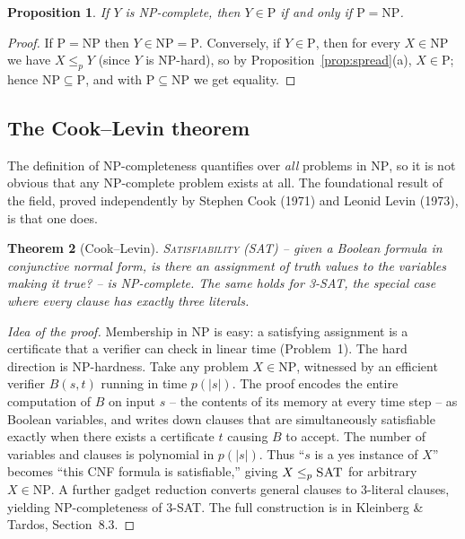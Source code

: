 \documentclass[11pt]{article}
\newtheorem{theorem}{Theorem}[section]
\newtheorem{proposition}[theorem]{Proposition}
\begin{document}
\begin{proposition}
\label{prop:np-collapse}
If $Y$ is NP-complete, then $Y \in \mathrm{P}$ if and only if $\mathrm{P} = \mathrm{NP}$.
\end{proposition}

\begin{proof}
If $\mathrm{P} = \mathrm{NP}$ then $Y \in \mathrm{NP} = \mathrm{P}$. Conversely, if $Y \in
\mathrm{P}$, then for every $X \in \mathrm{NP}$ we have $X \le_p Y$ (since $Y$ is NP-hard),
so by Proposition~\ref{prop:spread}(a), $X \in \mathrm{P}$; hence $\mathrm{NP} \subseteq
\mathrm{P}$, and with $\mathrm{P} \subseteq \mathrm{NP}$ we get equality.
\end{proof}

\subsection{The Cook--Levin theorem}

The definition of NP-completeness quantifies over \emph{all} problems in $\mathrm{NP}$, so
it is not obvious that any NP-complete problem exists at all. The foundational result of the
field, proved independently by Stephen Cook (1971) and Leonid Levin (1973), is that one
does.

\begin{theorem}[Cook--Levin]
\label{thm:cook-levin}
\textsc{Satisfiability} (\textsc{SAT}) -- given a Boolean formula in conjunctive normal
form, is there an assignment of truth values to the variables making it true? -- is
NP-complete. The same holds for \textsc{3-SAT}, the special case where every clause has
exactly three literals.
\end{theorem}

\begin{proof}[Idea of the proof]
Membership in $\mathrm{NP}$ is easy: a satisfying assignment is a certificate that a
verifier can check in linear time (Problem~1). The hard direction is NP-hardness. Take any
problem $X \in \mathrm{NP}$, witnessed by an efficient verifier $B(s, t)$ running in time
$p(|s|)$. The proof encodes the entire computation of $B$ on input $s$ -- the contents of
its memory at every time step -- as Boolean variables, and writes down clauses that are
simultaneously satisfiable exactly when there exists a certificate $t$ causing $B$ to
accept. The number of variables and clauses is polynomial in $p(|s|)$. Thus ``$s$ is a yes
instance of $X$'' becomes ``this CNF formula is satisfiable,'' giving $X \le_p \textsc{SAT}$
for arbitrary $X \in \mathrm{NP}$. A further gadget reduction converts general clauses to
3-literal clauses, yielding NP-completeness of \textsc{3-SAT}. The full construction is in
Kleinberg \& Tardos, Section~8.3.
\end{proof}
\end{document}
